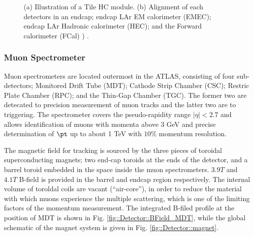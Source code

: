 \begin{figure}[h]
  \centering
    \caption{ (a) Illustration of a Tile HC module. (b)  Alignment of each detectors in an endcap; endcap LAr EM calorimeter (EMEC); endcap LAr Hadronic calorimeter (HEC); and the Forward calorimeter (FCal)   ) \cite{ATLAS_exp}.
      \label{fig::Detector::caloCell} }
\end{figure}




\subsubsection{Muon Spectrometer}
Muon spectrometers are located outermost in the ATLAS, consisting of four sub-detectors; Monitored Drift Tube (MDT); Cathode Strip Chamber (CSC); Restric Plate Chamber (RPC); and the Thin-Gap Chamber (TGC). 
The former two are detecated to precision measurement of muon tracks and the latter two are to triggering. 
The spectrometer covers the pseudo-rapidity range $ |\eta|< 2.7$ and allows identification of muons with momenta above 3 GeV and precise determination of $\pt$ up to about 1 TeV with $10\%$ momentum resolution.

The magnetic field for tracking is sourced by the three pieces of toroidal superconducting magnets; two end-cap toroids at the ends of the detector, and a barrel toroid embedded in the space inside the muon spectrometers. $3.9T$ and $4.1T$ B-field is provided in the barrel and endcap region respectively. The internal volume of toroldal coils are vacant (``air-core''), in order to reduce the material with which muons experience the multiple scattering, which is one of the limiting factors of the momentum measurement. The integrated B-filed profile at the position of MDT is shown in Fig. \ref{fig::Detector::BField_MDT}, while the global schematic of the magnet system is given in Fig. \ref{fig::Detector::magnet}.


